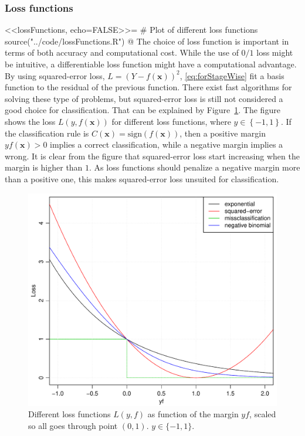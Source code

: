 \subsubsection{Loss functions}
\label{sub:Loss functions}
<<lossFunctions, echo=FALSE>>=
# Plot of different loss functions
source("../code/lossFunctions.R")
@
The choice of loss function is important in terms of both accuracy and computational cost. While the use of $0/1$ loss might be intuitive, a differentiable loss function might have a computational advantage. By using squared-error loss, $L = (Y - f(\mathbf{x}))^2$, \eqref{eq:forStageWise} fit a basis function to the residual of the previous function. There exist fast algorithms for solving these type of problems, but squared-error loss is still not considered a good choice for classification. That can be explained by Figure~\ref{fig:lossFunctions}. The figure shows the loss $L(y, f(\mathbf{x}))$ for different loss functions, where $y \in \left\{ -1, 1 \right\}$. If the classification rule is $C(\mathbf{x}) = \mathrm{sign}(f(\mathbf{x}))$, then a positive margin $y f(\mathbf{x}) > 0$ implies a correct classification, while a negative margin implies a wrong. It is clear from the figure that squared-error loss start increasing when the margin is higher than $1$. As loss functions should penalize a negative margin more than a positive one, this makes squared-error loss unsuited for classification.
%
\begin{figure}[h!tp]
\begin{center}
    \includegraphics[scale=0.5]{./figures/lossFunctions.pdf}
\end{center}
\caption{Different loss functions $L(y, f)$ as function of the margin $yf$, scaled so all goes through point $(0, 1)$. $y \in \{-1, 1\}$.}
\label{fig:lossFunctions}
\end{figure}
%

